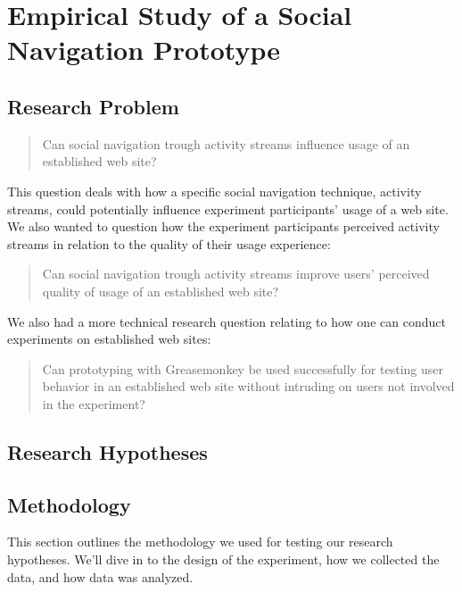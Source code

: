 \chapter{Empirical Study of a Social Navigation Prototype}
\label{chapter:empirical}

\section{Research Problem}

\begin{quote}
  Can social navigation trough activity streams influence
  usage of an established web site?
\end{quote}

This question deals with how a specific social navigation technique, activity
streams, could potentially influence experiment participants' usage of a web
site. We also wanted to question how the experiment participants perceived
activity streams in relation to the quality of their usage experience:

\begin{quote}
  Can social navigation trough activity streams improve users' perceived
  quality of usage of an established web site?
\end{quote}

We also had a more technical research question relating to how one can
conduct experiments on established web sites:

\begin{quote}
  Can prototyping with Greasemonkey be used successfully
  for testing user behavior in an established web site without
  intruding on users not involved in the experiment?
\end{quote}

\section{Research Hypotheses}


\section{Methodology}
\label{section:empirical.methodology}

This section outlines the methodology we used for testing our research
hypotheses. We'll dive in to the design of the experiment, how we collected
the data, and how data was analyzed.

